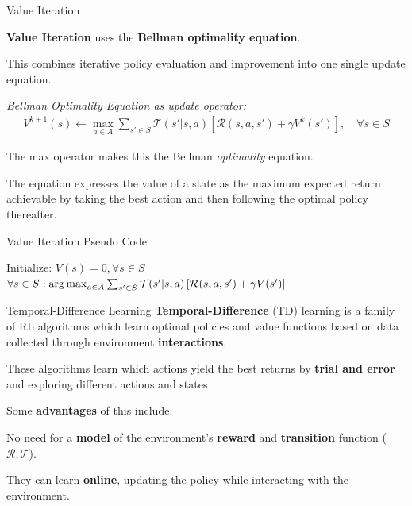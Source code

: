 \begin{frame}{Value Iteration}

    \blist
        \item \textbf{Value Iteration} uses the \textbf{Bellman optimality equation}.
        \item This combines iterative policy evaluation and improvement into one single update equation.
    \elist

    \textit{Bellman Optimality Equation as update operator:}
    \begin{align*}
        V^{k+1}(s) \gets \max_{a \in A} \sum_{s' \in S} \mathcal{T}(s' | s, a) [\mathcal{R}(s, a, s') + \gamma V^k(s')], \quad \forall s \in S
    \end{align*}

    \blist
        \item The max operator makes this the Bellman \textit{optimality} equation.
        \item The equation expresses the value of a state as the maximum expected return achievable by taking the best action and then following the optimal policy thereafter.
    \elist
\end{frame}

\begin{frame}[fragile]{Value Iteration Pseudo Code}


        \State Initialize: $V(s) = 0, \forall s \in S$
        \Repeat
            \State {}
        \State $\forall s \in S: \operatorname*{arg\,max}_{a \in A} \sum_{s' \in S}\mathcal{T}(s'|s, a)\left[\mathcal{R}(s, a, s')+\gamma V(s') \right]$
    \ealg

\end{frame}

\begin{frame}{Temporal-Difference Learning}
    \textbf{Temporal-Difference} (TD) learning is a family of RL algorithms which learn optimal policies and value functions based on data collected through environment \textbf{interactions}. 

    \blist
        \item These algorithms learn which actions yield the best returns by 
        \textbf{trial and error} and exploring different actions and states
    \elist
    \vspace{0pt}
    
    Some \textbf{advantages} of this include:
    \vspace{10pt}
    \blist
        \item No need for a \textbf{model} of the environment's \textbf{reward} and \textbf{transition} function ($\mathcal{R}, \mathcal{T}$). 
        \item They can learn \textbf{online}, updating the policy while interacting with the environment. 
    \elist
\end{frame}

